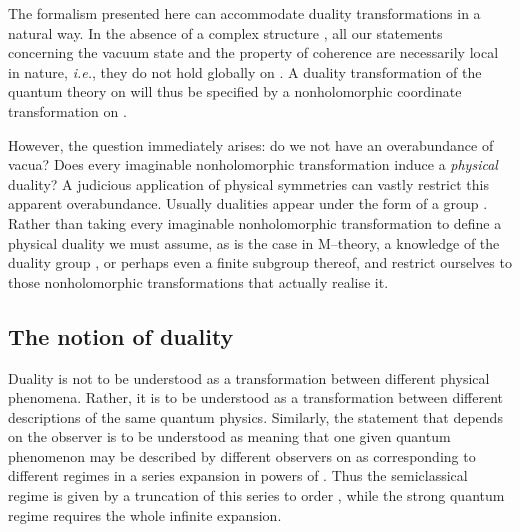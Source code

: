 \documentclass[a4paper,a4paper]{article}
\begin{document}
The formalism presented here can accommodate duality transformations in a 
natural way. In the absence of a complex structure \coordHE{}, 
all our statements concerning the vacuum state and the property of coherence are 
necessarily local in nature, {\it i.e.}, they do not hold globally on \coordHE{}. 
A duality transformation of the quantum theory on \coordHE{} will thus be specified 
by a nonholomorphic coordinate transformation on \coordHE{}.

However, the question immediately arises: do we not have an overabundance 
of vacua? Does every imaginable nonholomorphic transformation induce a 
{\it physical}\/ duality? A judicious application of physical symmetries 
can vastly restrict this apparent overabundance. Usually dualities appear under the form 
of a group \coordHE{}. Rather than taking every imaginable nonholomorphic transformation 
to define a physical duality we must assume, as is the case in M--theory, 
a knowledge of the duality group \coordHE{}, or perhaps even a finite subgroup thereof, 
and restrict ourselves to those nonholomorphic transformations that actually realise it. 

\subsection{The notion of duality}\label{notdual}

Duality is not to be understood as a transformation between different physical 
phenomena. Rather, it is to be understood as a transformation between different 
descriptions of the same quantum physics. Similarly, the statement that \myHighlight{$\hbar$}\coordHE{} 
depends on the observer is to be understood as meaning that one given quantum 
phenomenon may be described by different observers on \coordHE{} as corresponding 
to different regimes in a series expansion in powers of \myHighlight{$\hbar$}\coordHE{}. Thus
the semiclassical regime is given by a truncation of this series to order \myHighlight{$\hbar$}\coordHE{}, 
while the strong quantum regime requires the whole infinite expansion.
\end{document}
